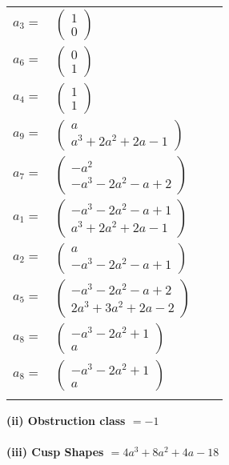 \documentclass[1p]{elsarticle_modified}
\theoremstyle{definition}
\begin{document}
\begin{tabular}{m{7pt} m{180pt} m{7pt} m{180pt} }
\flushright $a_{3}=$&$\begin{pmatrix}1\\0\end{pmatrix}$ \\
\flushright $a_{6}=$&$\begin{pmatrix}0\\1\end{pmatrix}$ \\
\flushright $a_{4}=$&$\begin{pmatrix}1\\1\end{pmatrix}$ \\
\flushright $a_{9}=$&$\begin{pmatrix}a\\a^3+2 a^2+2 a-1\end{pmatrix}$ \\
\flushright $a_{7}=$&$\begin{pmatrix}- a^2\\- a^3-2 a^2- a+2\end{pmatrix}$ \\
\flushright $a_{1}=$&$\begin{pmatrix}- a^3-2 a^2- a+1\\a^3+2 a^2+2 a-1\end{pmatrix}$ \\
\flushright $a_{2}=$&$\begin{pmatrix}a\\- a^3-2 a^2- a+1\end{pmatrix}$ \\
\flushright $a_{5}=$&$\begin{pmatrix}- a^3-2 a^2- a+2\\2 a^3+3 a^2+2 a-2\end{pmatrix}$ \\
\flushright $a_{8}=$&$\begin{pmatrix}- a^3-2 a^2+1\\a\end{pmatrix}$\\ \flushright $a_{8}=$&$\begin{pmatrix}- a^3-2 a^2+1\\a\end{pmatrix}$\\&\end{tabular}
\flushleft \textbf{(ii) Obstruction class $= -1$}\\~\\
\flushleft \textbf{(iii) Cusp Shapes $= 4 a^3+8 a^2+4 a-18$}\\~\\
\end{document}
